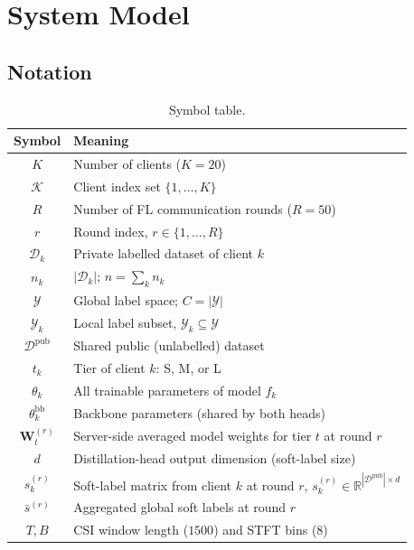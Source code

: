 \documentclass[conference]{IEEEtran}
\begin{document}
\section{System Model}
\label{sec:sysmodel}

\subsection{Notation}

\begin{table}[t]
\centering\footnotesize
\caption{Symbol table.}
\label{tab:symbols}
\setlength{\tabcolsep}{4pt}
\begin{tabular}{@{}cl@{}}
\toprule
\textbf{Symbol} & \textbf{Meaning}\\
\midrule
$K$                          & Number of clients ($K{=}20$)\\
$\mathcal{K}$                & Client index set $\{1,\ldots,K\}$\\
$R$                          & Number of FL communication rounds ($R{=}50$)\\
$r$                          & Round index, $r\!\in\!\{1,\ldots,R\}$\\
$\mathcal{D}_k$              & Private labelled dataset of client $k$\\
$n_k$                        & $|\mathcal{D}_k|$; $n = \sum_k n_k$\\
$\mathcal{Y}$                & Global label space; $C{=}|\mathcal{Y}|$\\
$\mathcal{Y}_k$              & Local label subset, $\mathcal{Y}_k \subseteq \mathcal{Y}$\\
$\mathcal{D}^{\text{pub}}$   & Shared public (unlabelled) dataset\\
$t_k$                        & Tier of client $k$: S, M, or L\\
$\theta_k$                   & All trainable parameters of model $f_k$\\
$\theta_k^{\text{bb}}$       & Backbone parameters (shared by both heads)\\
$\mathbf{W}_t^{(r)}$         & Server-side averaged model weights for tier $t$ at round $r$\\
$d$                          & Distillation-head output dimension (soft-label size)\\
$s_k^{(r)}$                  & Soft-label matrix from client $k$ at round $r$,
                               $s_k^{(r)}\!\in\!\mathbb{R}^{|\mathcal{D}^{\text{pub}}|\times d}$\\
$\bar{s}^{(r)}$              & Aggregated global soft labels at round $r$\\
$T,B$                        & CSI window length ($1500$) and STFT bins ($8$)\\
\bottomrule
\end{tabular}
\end{table}
\end{document}
